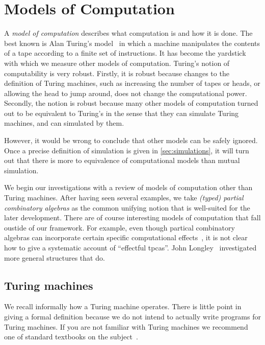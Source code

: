 \chapter{Models of Computation}
\label{cha:models}


A \emph{model of computation} describes what computation is and how it
is done. The best known is Alan Turing's
model~ in which a
machine manipulates the contents of a tape according to a finite set
of instructions. It has become the yardstick with which we measure
other models of computation. Turing's notion of computability is very
robust. Firstly, it is robust because changes to the definition of
Turing machines, such as increasing the number of tapes or heads, or
allowing the head to jump around, does not change the computational
power. Secondly, the notion is robust because many other models of
computation turned out to be equivalent to Turing's in the sense
that they can simulate Turing machines, and can simulated by them.

However, it would be wrong to conclude that other models can be safely ignored. Once a precise definition of simulation
is given in \cref{sec:simulations}, it will turn out that there is more to equivalence of computational models than mutual simulation.

We begin our investigations with a review of models of computation other than Turing machines. After having seen several examples, we take \emph{(typed) partial combinatory algebras} as the common unifying notion that is well-suited for the later development.
%
There are of course interesting models of computation that fall oustide of our framework.
For example, even though partical combinatory algebras can incorporate certain specific computational effects~, it is not clear how to give a systematic account of ``effectful tpcas''. John Longley~ investigated more general structures that do.



\section{Turing machines}
\label{sec:turing-machines}

We recall informally how a Turing machine operates. There is little
point in giving a formal definition because we do not intend to
actually write programs for Turing machines. If you are not familiar
with Turing machines we recommend one of standard textbooks on the
subject~.

